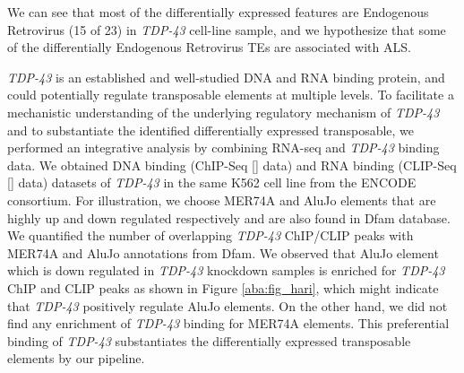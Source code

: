 \documentclass[wsdraft]{ws-procs11x85}
\begin{document}
We can see that most of the differentially expressed features are Endogenous Retrovirus (15 of 23) in \textit{TDP-43} cell-line sample, and we hypothesize that some of the differentially Endogenous Retrovirus TEs are associated with ALS.

\textit{TDP-43} is an established and well-studied DNA and RNA binding protein,
and could potentially regulate transposable elements at multiple levels.\cite{tan2016extensive} 
To facilitate a mechanistic understanding of the underlying regulatory mechanism of \textit{TDP-43} and to substantiate the identified differentially expressed transposable, we performed an integrative analysis by combining RNA-seq and \textit{TDP-43} binding data. 
We obtained DNA binding (ChIP-Seq [] data) and RNA binding (CLIP-Seq [] data)
datasets of \textit{TDP-43} in the same K562 cell line from the ENCODE consortium.
For illustration, we choose MER74A and AluJo elements that are highly up and down regulated respectively and are also found in 
Dfam database.\cite{hubley2015dfam} We quantified the number of overlapping \textit{TDP-43} ChIP/CLIP peaks with MER74A and AluJo annotations 
from Dfam. We observed that AluJo element which is down regulated in \textit{TDP-43} knockdown samples is enriched for \textit{TDP-43} 
ChIP and CLIP peaks as shown in Figure \ref{aba:fig_hari}, which might indicate that \textit{TDP-43} positively regulate AluJo elements. 
On the other hand, we did not find any enrichment of \textit{TDP-43} binding for MER74A elements. This preferential binding of \textit{TDP-43} substantiates the differentially expressed transposable elements by our pipeline. 
\end{document}
